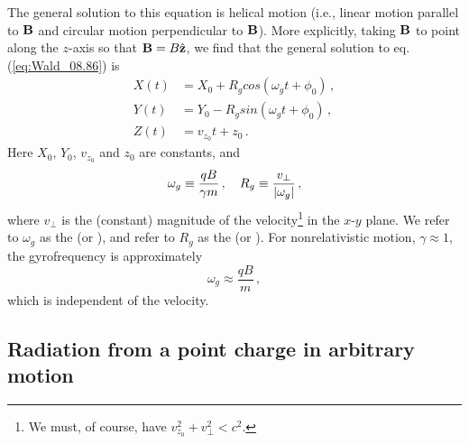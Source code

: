 The general solution to this equation is helical motion (i.e., linear motion parallel to $\vb{B}$ and circular motion perpendicular to $\vb{B}$). More explicitly, taking $\vb{B}$ to point along the $z$-axis so that $\vb{B} = B \hat{\vb{z}}$, we find that the general solution to eq. (\ref{eq:Wald_08.86}) is
\begin{equation}\label{eq:Wald_08.87}
\begin{aligned}
X(t) &= X_0 + R_g cos(\omega_g t + \phi_0)\,,\\
Y(t) &= Y_0 - R_g sin(\omega_g t + \phi_0)\,,\\
Z(t) &= v_{z_0} t + z_0\,.
\end{aligned}
\end{equation}
Here $X_0$, $Y_0$, $v_{z_0}$ and $z_0$ are constants, and 
\begin{equation}\label{eq:Wald_08.88}
\omega_g \equiv \frac{qB}{\gamma m}\,, \quad R_g \equiv \frac{v_\perp}{\abs{\omega_g}}\,,
\end{equation}
where $v_\perp$ is the (constant) magnitude of the velocity\footnote{We must, of course, have $v^2_{z_0} + v^2_\perp < c^2$.} in the $x\text{-}y$ plane. 
We refer to $\omega_g$ as the  (or ), and refer to $R_g$ as the  (or ). For nonrelativistic motion, $\gamma \approx 1$, the gyrofrequency is approximately
\begin{equation}\label{eq:Wald_08.89}
\omega_g \approx \frac{qB}{m}\,,
\end{equation}
which is independent of the velocity.

 
   

\subsection{Radiation from a point charge in arbitrary motion}
\label{subsec:Wald_08.3.2}